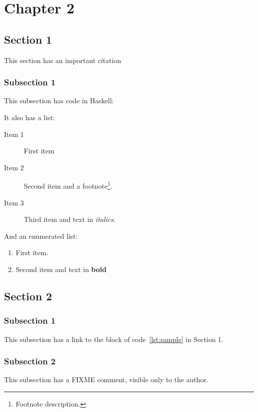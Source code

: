 \chapter{Chapter 2}\label{ch:ch2}

\section{Section 1}

This section has an important citation\cite{inproceeding}

\subsection{Subsection 1}

This subsection has code in Haskell:

It also has a list:
\begin{description}
\item[Item 1]
	First item
\item[Item 2]
	Second item and a footnote\footnote
	{Footnote description.}.
\item[Item 3]
	Third item and text in \textit{italics}.
\end{description}

And an enumerated list:

\begin{enumerate}
\item	First item.
\item	Second item and text in \textbf{bold}
\end{enumerate}

\section{Section 2}

\subsection{Subsection 1}
This subsection has a link to the block of code~\ref{lst:sample} in Section 1.

\subsection{Subsection 2}

This subsection has a FIXME comment, visible only to the author.

